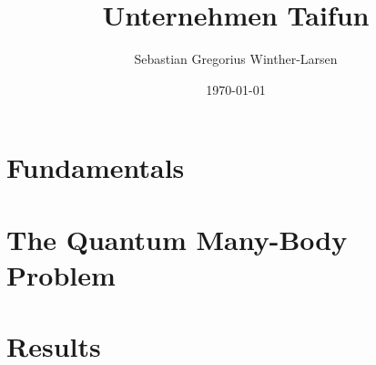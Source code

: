 \documentclass[twoside, english, notitlepage, 10pt]{uiofysmaster}
\author{Sebastian Gregorius Winther-Larsen}
\title{Unternehmen Taifun}
\date{\today}
\begin{document}
\frontmatter
    \maketitle

    \tableofcontents

\mainmatter

    \part{Fundamentals}

        
        

    \part{The Quantum Many-Body Problem}

        
        

    \part{Results}

        

    \appendix

        

        
\printbibliography
\end{document}
